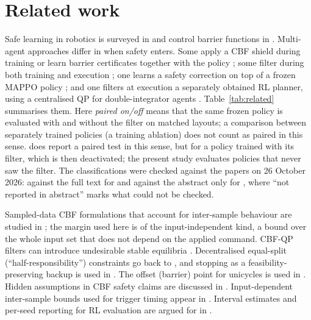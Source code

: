 \documentclass[11pt]{article}
\begin{document}
\section{Related work}\label{sec:related}
Safe learning in robotics is surveyed in \cite{brunke2022} and control barrier functions in
\cite{ames2019}. Multi-agent approaches differ in when safety enters. Some apply a CBF shield during
training \cite{cai2021} or learn barrier certificates together with the policy
\cite{qin2021,zhang2025gcbf,zhang2025dgppo}; some filter during both training and execution
\cite{choi2025,dawood2025}; one learns a safety correction on top of a frozen MAPPO policy
\cite{deng2026}; and one filters at execution a separately obtained RL planner, using a centralised
QP for double-integrator agents \cite{vinod2022}. Table~\ref{tab:related} summarises them. Here
\emph{paired on/off} means that the same frozen policy is evaluated with and without the filter on
matched layouts; a comparison between separately trained policies (a training ablation) does not count
as paired in this sense. \cite{dawood2025} does report a paired test in this sense, but for a policy
trained with its filter, which is then deactivated; the present study evaluates policies that never
saw the filter. The classifications were checked against the papers on 26 October 2026: against the
full text for \cite{cai2021,choi2025,dawood2025,deng2026,vinod2022} and against the abstract only
for \cite{qin2021,zhang2025gcbf,zhang2025dgppo}, where ``not reported in abstract'' marks what could
not be checked.

Sampled-data CBF formulations that account for inter-sample behaviour are studied in
\cite{singletary2020,breeden2022,tan_zocbf,liu_sacbf}; the margin used here is of the
input-independent kind, a bound over the whole input set that does not depend on the applied command.
CBF-QP filters can introduce undesirable stable equilibria \cite{reis2021}. Decentralised equal-split
(``half-responsibility'') constraints go back to \cite{wang2017,vandenberg2011}, and stopping as a
feasibility-preserving backup is used in \cite{chen2021}. The offset (barrier) point for unicycles
is used in \cite{emam2019}. Hidden assumptions in CBF safety claims are discussed in
\cite{kim2026}. Input-dependent inter-sample bounds used for trigger timing appear in
\cite{yang2019}. Interval estimates and per-seed reporting for RL evaluation are argued for in
\cite{agarwal2021}.
\end{document}
